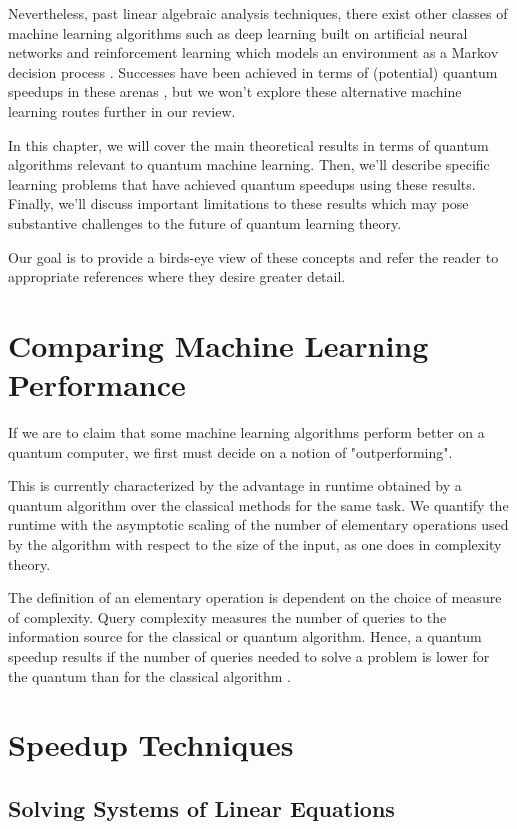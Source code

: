 \documentclass[main.tex]{subfiles}
\begin{document}
Nevertheless, past linear algebraic analysis techniques, there exist other classes of machine learning algorithms such as deep learning built on artificial neural networks and reinforcement learning which models an environment as a Markov decision process \cite{sutton1998reinforcement}. Successes have been achieved in terms of (potential) quantum speedups in these arenas \cite{dong2008quantum}, but we won't explore these alternative machine learning routes further in our review. 

In this chapter, we will cover the main theoretical results in terms of quantum algorithms relevant to quantum machine learning. Then, we'll describe specific learning problems that have achieved quantum speedups using these results. Finally, we'll discuss important limitations to these results which may pose substantive challenges to the future of quantum learning theory.

Our goal is to provide a birds-eye view of these concepts and refer the reader to appropriate references where they desire greater detail.

\section{Comparing Machine Learning Performance}

If we are to claim that some machine learning algorithms perform better on a quantum computer, we first must decide on a notion of "outperforming". 

This is currently characterized by the advantage in runtime obtained by a quantum algorithm over the classical methods for the same task. We quantify the runtime with the asymptotic scaling of the number of elementary operations used by the algorithm with respect to the size of the input, as one does in complexity theory. 

The definition of an elementary operation is dependent on the choice of measure of complexity. Query complexity measures the number of queries to the information source for the classical or quantum algorithm. Hence, a quantum speedup results if the number of queries needed to solve a problem is lower for the quantum than for the classical algorithm \cite{biamonte2017quantum}.

\section{Speedup Techniques}
   
\subsection{Solving Systems of Linear Equations}
\end{document}
